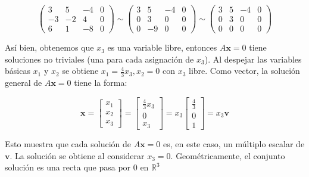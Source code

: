 \documentclass{article}
\begin{document}
\begin{equation*}
    \left(\begin{array}{rrr|r}
        3 & 5 & -4 & 0 \\
        -3 & -2 & 4 & 0 \\
        6 & 1 & -8 & 0
    \end{array}\right) \sim
    \left(\begin{array}{rrr|r}
        3 & 5 & -4 & 0 \\
        0 & 3 & 0 & 0 \\
        0 & -9 & 0 & 0
    \end{array}\right)\sim
    \left(\begin{array}{rrr|r}
        3 & 5 & -4 & 0 \\
        0 & 3 & 0 & 0 \\
        0 & 0 & 0 & 0
    \end{array}\right)
\end{equation*}

Así bien, obtenemos que $x_3$ es una variable libre, entonces $A\mathbf{x} = 0$ tiene soluciones no triviales (una para cada asignación de $x_3$). Al despejar las variables básicas $x_1$ y $x_2$ se obtiene $x_1 = \frac{4}{3}x_3, x_2=0$ con $x_3$ libre. Como vector, la solución general de $A\mathbf{x} = 0$ tiene la forma:

\begin{equation*}
    \mathbf{x} = \left[\begin{array}{r}
        x_1\\
        x_2\\
        x_3
    \end{array}\right]
    = \left[\begin{array}{r}
        \frac{4}{3}x_3\\
        0\\
        x_3
    \end{array}\right] 
    = x_3 \left[\begin{array}{r}
        \frac{4}{3}\\
        0\\
        1
    \end{array}\right]
    = x_3\mathbf{v}
\end{equation*}

Esto muestra que cada solución de $A\mathbf{x} = 0$ es, en este caso, un múltiplo escalar de $\mathbf{v}$. La solución se obtiene al considerar $x_3=0$. Geométricamente, el conjunto solución es una recta que pasa por 0 en $\mathbb{R}^3$
\end{document}
